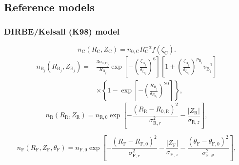 \documentclass{aa}
\begin{document}
\subsection{Reference models}

\subsubsection{DIRBE/Kelsall (K98) model}

\begin{equation}
n_\mathrm{C}(R_\mathrm{C}, Z_\mathrm{C}) = n_{0,\mathrm{C}} R_\mathrm{C}^{-\alpha} f(\zeta_\mathrm{C}).
\end{equation}
\begin{equation}
    \begin{aligned}
        n_{\mathrm{B}_j}(R_{\mathrm{B}_j}, Z_{\mathrm{B}_j})=& \frac{3 n_{0, \mathrm{B}_j}}{R_{\mathrm{B}_j}} \exp \left[-\left(\frac{\zeta_{\mathrm{B}_j}}{\delta_{\zeta_{\mathrm B_j}}}\right)^{6}\right]\left[1 + \left(\frac{\zeta_{\mathrm{B}_j}}{\delta_{\zeta_{\mathrm{B}_j}}}\right)^{p_{\mathrm{B}_j}}v^{-1}_{\mathrm{B}_j}\right] \\
        & \times\left\{1-\exp \left[-\left(\frac{R_{\mathrm{B}_j}}{\delta_{R_{\mathrm{B}_j}}}\right)^{20}\right]\right\},
    \end{aligned}
\end{equation}
\begin{equation}\label{eq: ring}
    n_\mathrm{R}(R_\mathrm{R}, Z_\mathrm{R})=n_{\mathrm{R},0} \exp \left[-\frac{\left(R_\mathrm{R}-R_{0, \mathrm{R}}\right)^2}{\sigma_{\mathrm{R}, r} ^2}-\frac{\left| Z_\mathrm{R} \right|}{\sigma_{\mathrm{R}, z}}\right],
\end{equation}

\begin{equation}\label{eq: feature}
   n_\mathrm{F}(R_\mathrm{F}, Z_\mathrm{F}, \theta_\mathrm{F}) = n_{\mathrm{F}, 0} \exp \left[-\frac{\left(R_\mathrm{F}-R_{\mathrm{F}, 0}\right)^{2}}{\sigma_{\mathrm{F}, r}^{2}}-\frac{\left|Z_\mathrm{F}\right|}{\sigma_{\mathrm{F}, z}}-\frac{\left(\theta_\mathrm{F}-\theta_{\mathrm{F}, 0}\right)^{2}}{\sigma_{\mathrm{F}, \theta }^{2}}\right],
\end{equation}
\end{document}
